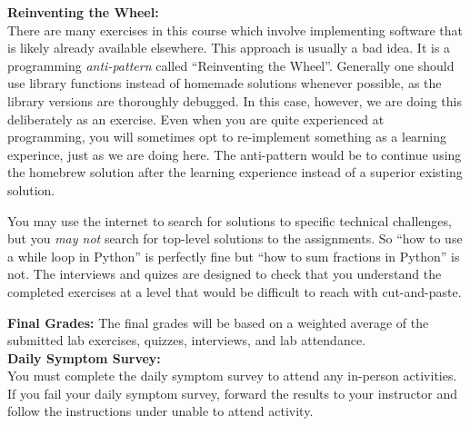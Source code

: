 \documentclass[12pt]{article}
\begin{document}
\noindent
\textbf {Reinventing the Wheel:}\\
There are many exercises in this course which involve implementing
software that is likely already available elsewhere.  This approach
is usually a bad idea.  It is a programming {\em anti-pattern} called
``Reinventing the Wheel''.  Generally one should use library functions
instead of homemade solutions whenever possible, as the library
versions are thoroughly debugged.  In this case, however, we are doing
this deliberately as an exercise.  Even when you are quite experienced
at programming, you will sometimes opt to re-implement something as a
learning experince, just as we are doing here.  The anti-pattern would
be to continue using the homebrew solution after the learning
experience instead of a superior existing solution.

You may use the internet to search for solutions to specific technical
challenges, but you {\em may not} search for top-level solutions to
the assignments.  So ``how to use a while loop in Python'' is
perfectly fine but ``how to sum fractions in Python'' is not.  The
interviews and quizes are designed to check that you understand the
completed exercises at a level that would be difficult to reach with
cut-and-paste.

\noindent
\textbf{Final Grades:} The final grades will be based on a weighted
average of the submitted lab exercises, quizzes, interviews, and lab
attendance. \\

\noindent
\textbf{Daily Symptom Survey:}\\
You must complete the daily symptom survey to attend any in-person
activities.  If you fail your daily symptom survey, forward the
results to your instructor and follow the instructions under unable to
attend activity.
\end{document}
